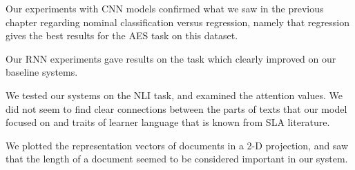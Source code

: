 Our experiments with \ac{CNN} models confirmed what we saw in the previous
chapter regarding nominal classification versus regression, namely that
regression gives the best results for the \ac{AES} task on this dataset.

Our \ac{RNN} experiments gave results on the task which clearly improved on
our baseline systems.

We tested our systems on the NLI task, and examined the attention values.
We did not seem to find clear connections between the parts of texts that our
model focused on and traits of learner language that is known from \ac{SLA}
literature.

We plotted the representation vectors of documents in a 2-D projection, and
saw that the length of a document seemed to be considered important in our
system.
